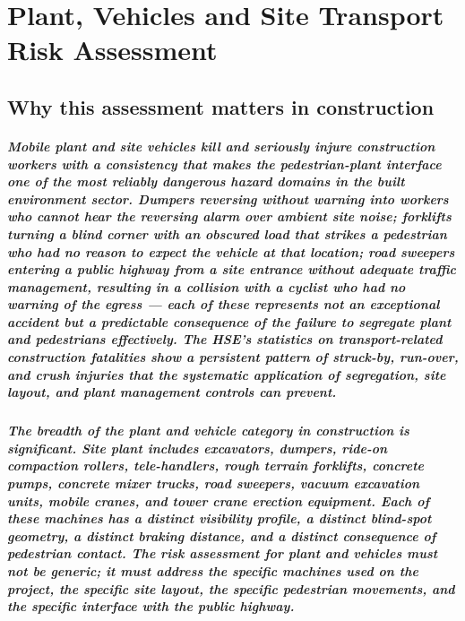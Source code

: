 \chapter{Plant, Vehicles and Site Transport Risk Assessment}
\label{chap:Plant, Vehicles and Site Transport Risk Assessment}

\section{Why this assessment matters in construction}

\paragraph{Mobile plant and site vehicles kill and seriously injure construction workers with a consistency that makes the pedestrian-plant interface one of the most reliably dangerous hazard domains in the built environment sector. Dumpers reversing without warning into workers who cannot hear the reversing alarm over ambient site noise; forklifts turning a blind corner with an obscured load that strikes a pedestrian who had no reason to expect the vehicle at that location; road sweepers entering a public highway from a site entrance without adequate traffic management, resulting in a collision with a cyclist who had no warning of the egress --- each of these represents not an exceptional accident but a predictable consequence of the failure to segregate plant and pedestrians effectively. The HSE's statistics on transport-related construction fatalities show a persistent pattern of struck-by, run-over, and crush injuries that the systematic application of segregation, site layout, and plant management controls can prevent.}

\paragraph{The breadth of the plant and vehicle category in construction is significant. Site plant includes excavators, dumpers, ride-on compaction rollers, tele-handlers, rough terrain forklifts, concrete pumps, concrete mixer trucks, road sweepers, vacuum excavation units, mobile cranes, and tower crane erection equipment. Each of these machines has a distinct visibility profile, a distinct blind-spot geometry, a distinct braking distance, and a distinct consequence of pedestrian contact. The risk assessment for plant and vehicles must not be generic; it must address the specific machines used on the project, the specific site layout, the specific pedestrian movements, and the specific interface with the public highway.}

